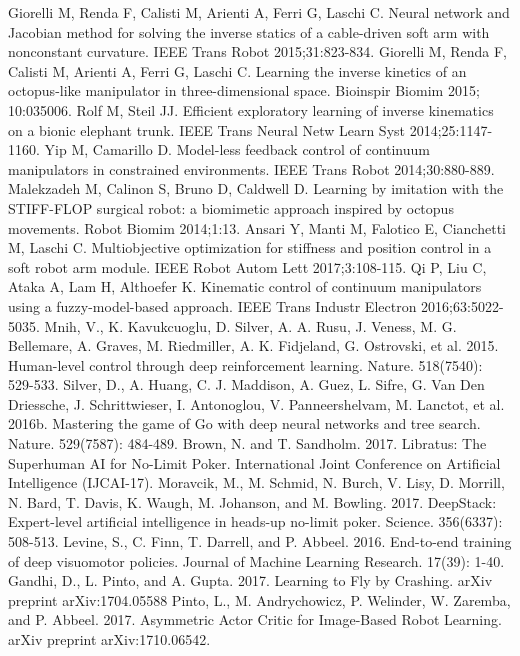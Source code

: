 \documentclass[12pt,twoside,a4]{mwbk}
\begin{document}
\begin{thebibliography}{9}
 Giorelli M, Renda F, Calisti M, Arienti A, Ferri G, Laschi C. Neural network and Jacobian method for solving the inverse statics of a cable-driven soft arm with nonconstant curvature. IEEE Trans Robot 2015;31:823-834.
 Giorelli M, Renda F, Calisti M, Arienti A, Ferri G, Laschi C. Learning the inverse kinetics of an octopus-like manipulator in three-dimensional space. Bioinspir Biomim 2015; 10:035006.
 Rolf M, Steil JJ. Efficient exploratory learning of inverse kinematics on a bionic elephant trunk. IEEE Trans Neural Netw Learn Syst 2014;25:1147-1160.
 Yip M, Camarillo D. Model-less feedback control of continuum manipulators in constrained environments. IEEE Trans Robot 2014;30:880-889.
 Malekzadeh M, Calinon S, Bruno D, Caldwell D. Learning by imitation with the STIFF-FLOP surgical robot: a biomimetic approach inspired by octopus movements. Robot Biomim 2014;1:13.
 Ansari Y, Manti M, Falotico E, Cianchetti M, Laschi C. Multiobjective optimization for stiffness and position control in a soft robot arm module. IEEE Robot Autom Lett 2017;3:108-115.
 Qi P, Liu C, Ataka A, Lam H, Althoefer K. Kinematic control of continuum manipulators using a fuzzy-model-based approach. IEEE Trans Industr Electron 2016;63:5022-5035.
 Mnih, V., K. Kavukcuoglu, D. Silver, A. A. Rusu, J. Veness, M. G. Bellemare, A. Graves, M. Riedmiller, A. K. Fidjeland, G. Ostrovski, et al. 2015. Human-level control through deep reinforcement learning. Nature. 518(7540): 529-533.
 Silver, D., A. Huang, C. J. Maddison, A. Guez, L. Sifre, G. Van Den Driessche, J. Schrittwieser, I. Antonoglou, V. Panneershelvam, M. Lanctot, et al. 2016b. Mastering the game of Go with deep neural networks and tree search. Nature. 529(7587): 484-489.
 Brown, N. and T. Sandholm. 2017. Libratus: The Superhuman AI for No-Limit Poker. International Joint Conference on Artificial Intelligence (IJCAI-17).
 Moravcik, M., M. Schmid, N. Burch, V. Lisy, D. Morrill, N. Bard, T. Davis, K. Waugh, M. Johanson, and M. Bowling. 2017. DeepStack: Expert-level artificial intelligence in heads-up no-limit poker. Science. 356(6337): 508-513.
 Levine, S., C. Finn, T. Darrell, and P. Abbeel. 2016. End-to-end training of deep visuomotor policies. Journal of Machine Learning Research. 17(39): 1-40.
 Gandhi, D., L. Pinto, and A. Gupta. 2017. Learning to Fly by Crashing. arXiv preprint arXiv:1704.05588
 Pinto, L., M. Andrychowicz, P. Welinder, W. Zaremba, and P. Abbeel. 2017. Asymmetric Actor Critic for Image-Based Robot Learning. arXiv preprint arXiv:1710.06542.

\end{thebibliography}
\end{document}
